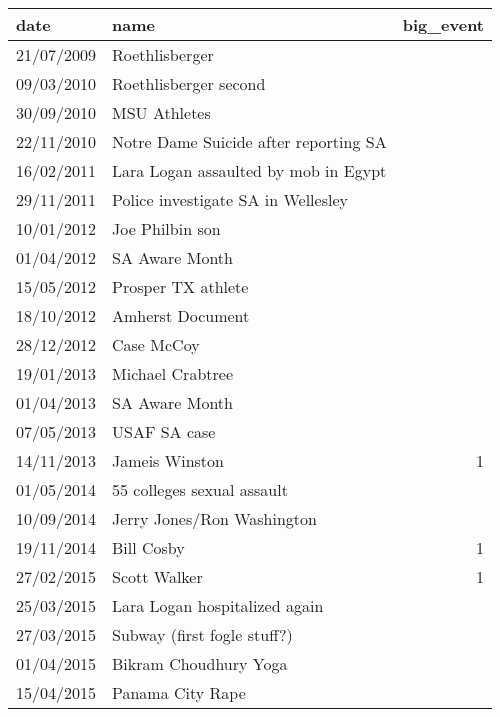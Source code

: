 {
\def\sym#1{\ifmmode^{#1}\else\(^{#1}\)\fi}
\begin{tabular}{llr}
\hline\hline
date       & name                                  & big\_event \\
\hline
21/07/2009 & Roethlisberger                        &            \\
09/03/2010 & Roethlisberger second                 &            \\
30/09/2010 & MSU Athletes                          &            \\
22/11/2010 & Notre Dame Suicide after reporting SA &            \\
16/02/2011 & Lara Logan assaulted by mob in Egypt  &            \\
29/11/2011 & Police investigate SA in Wellesley    &            \\
10/01/2012 & Joe Philbin son                       &            \\
01/04/2012 & SA Aware Month                        &            \\
15/05/2012 & Prosper TX athlete                    &            \\
18/10/2012 & Amherst Document                      &            \\
28/12/2012 & Case McCoy                            &            \\
19/01/2013 & Michael Crabtree                      &            \\
01/04/2013 & SA Aware Month                        &            \\
07/05/2013 & USAF SA case                          &            \\
14/11/2013 & Jameis Winston                        & 1          \\
01/05/2014 & 55 colleges sexual assault            &            \\
10/09/2014 & Jerry Jones/Ron Washington            &            \\
19/11/2014 & Bill Cosby                            & 1          \\
27/02/2015 & Scott Walker                          & 1          \\
25/03/2015 & Lara Logan hospitalized again         &            \\
27/03/2015 & Subway (first fogle stuff?)           &            \\
01/04/2015 & Bikram Choudhury Yoga                 &            \\
15/04/2015 & Panama City Rape                      &            \\

\end{tabular}}
